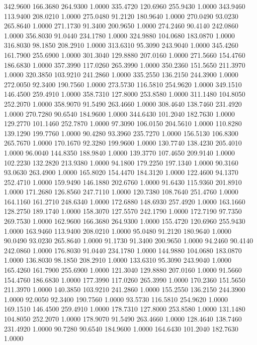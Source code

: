   342.9600  166.3680  264.9300    1.0000
  335.4720  120.6960  255.9430    1.0000
  343.9460  113.9400  208.0210    1.0000
  275.0480   91.2120  180.9640    1.0000
  270.0490   93.0230  265.8640    1.0000
  271.1730   91.3400  200.9650    1.0000
  274.2460   90.4140  242.0860    1.0000
  356.8030   91.0440  234.1780    1.0000
  324.9880  104.0680  183.0870    1.0000
  316.8030   98.1850  208.2910    1.0000
  313.6310   95.3090  243.9040    1.0000
  345.4260  161.7900  255.6900    1.0000
  301.3040  129.8880  207.0160    1.0000
  271.5660  154.4760  186.6830    1.0000
  357.3990  117.0260  265.3990    1.0000
  350.2360  151.5650  211.3970    1.0000
  320.3850  103.9210  241.2860    1.0000
  335.2550  136.2150  244.3900    1.0000
  272.0050   92.3400  190.7560    1.0000
  273.5730  116.5810  254.9620    1.0000
  349.1510  146.4500  259.4910    1.0000
  358.7310  127.8000  253.8580    1.0000
  311.1480  104.8050  252.2070    1.0000
  358.9070   91.5490  263.4660    1.0000
  308.4640  138.7460  231.4920    1.0000
  270.7280   90.6540  184.9600    1.0000
  344.6430  101.2040  182.7630    1.0000
  129.2770  101.1460  252.7870    1.0000
   97.3090  106.0150  204.5610    1.0000
  110.8280  139.1290  199.7760    1.0000
   90.4280   93.3960  235.7270    1.0000
  156.5130  106.8300  265.7670    1.0000
  170.1670   92.3280  199.9600    1.0000
  130.7740  138.4230  205.4010    1.0000
   96.0040  144.8350  188.9840    1.0000
  139.3770  107.4650  209.9140    1.0000
  102.2230  132.2820  213.9380    1.0000
   94.1800  179.2250  197.1340    1.0000
   90.3160   93.0630  263.4900    1.0000
  165.8020  154.4470  184.3120    1.0000
  122.4600   94.1370  252.4710    1.0000
  159.9490  146.1880  202.6760    1.0000
   91.6430  115.9360  201.8910    1.0000
  171.2680  126.8560  247.7110    1.0000
  120.7380  108.7640  251.4760    1.0000
  164.1160  161.2710  248.6340    1.0000
  172.6880  148.6930  257.4920    1.0000
  163.1660  128.2750  189.1740    1.0000
  158.3070  127.5570  242.1790    1.0000
  172.7190   97.7350  269.7530    1.0000
  162.9600  166.3680  264.9300    1.0000
  155.4720  120.6960  255.9430    1.0000
  163.9460  113.9400  208.0210    1.0000
   95.0480   91.2120  180.9640    1.0000
   90.0490   93.0230  265.8640    1.0000
   91.1730   91.3400  200.9650    1.0000
   94.2460   90.4140  242.0860    1.0000
  176.8030   91.0440  234.1780    1.0000
  144.9880  104.0680  183.0870    1.0000
  136.8030   98.1850  208.2910    1.0000
  133.6310   95.3090  243.9040    1.0000
  165.4260  161.7900  255.6900    1.0000
  121.3040  129.8880  207.0160    1.0000
   91.5660  154.4760  186.6830    1.0000
  177.3990  117.0260  265.3990    1.0000
  170.2360  151.5650  211.3970    1.0000
  140.3850  103.9210  241.2860    1.0000
  155.2550  136.2150  244.3900    1.0000
   92.0050   92.3400  190.7560    1.0000
   93.5730  116.5810  254.9620    1.0000
  169.1510  146.4500  259.4910    1.0000
  178.7310  127.8000  253.8580    1.0000
  131.1480  104.8050  252.2070    1.0000
  178.9070   91.5490  263.4660    1.0000
  128.4640  138.7460  231.4920    1.0000
   90.7280   90.6540  184.9600    1.0000
  164.6430  101.2040  182.7630    1.0000